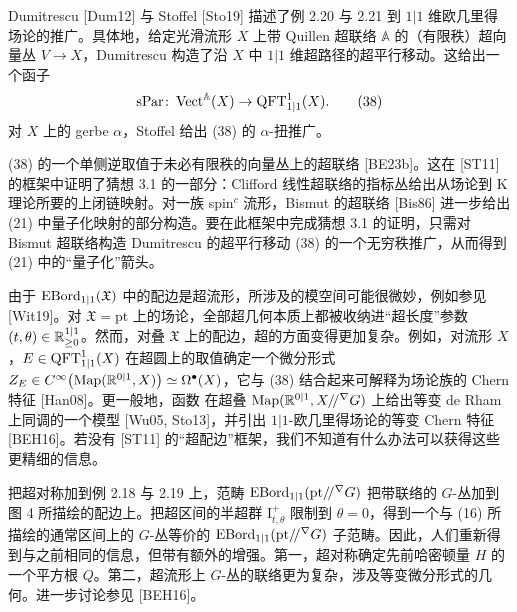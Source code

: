 \begin{example}[3.23（带超联络的超向量丛）]
Dumitrescu [Dum12] 与 Stoffel [Sto19] 描述了例 2.20 与 2.21 到 $1|1$ 维欧几里得场论的推广。具体地，给定光滑流形 $X$ 上带 Quillen 超联络 $\mathbb{A}$ 的（有限秩）超向量丛 $V\to X$，Dumitrescu 构造了沿 $X$ 中 $1|1$ 维超路径的超平行移动。这给出一个函子
\begin{equation}
\mathrm{sPar}\colon\operatorname{Vect}^{\mathbb{A}}(X)\to\operatorname{QFT}^1_{1|1}(X).
\tag{38}
\end{equation}
对 $X$ 上的 gerbe $\alpha$，Stoffel 给出 (38) 的 $\alpha$-扭推广。
\end{example}

\begin{remark}[3.24]
(38) 的一个单侧逆取值于未必有限秩的向量丛上的超联络 [BE23b]。这在 [ST11] 的框架中证明了猜想 3.1 的一部分：Clifford 线性超联络的指标丛给出从场论到 K 理论所要的上闭链映射。对一族 spin$^c$ 流形，Bismut 的超联络 [Bis86] 进一步给出 (21) 中量子化映射的部分构造。要在此框架中完成猜想 3.1 的证明，只需对 Bismut 超联络构造 Dumitrescu 的超平行移动 (38) 的一个无穷秩推广，从而得到 (21) 中的“量子化”箭头。
\end{remark}

\begin{remark}[3.25]
由于 $\operatorname{EBord}_{1|1}(\mathfrak X)$ 中的配边是超流形，所涉及的模空间可能很微妙，例如参见 [Wit19]。对 $\mathfrak X=\mathrm{pt}$ 上的场论，全部超几何本质上都被收纳进“超长度”参数 $(t,\theta)\in\mathbb{R}^{1|1}_{\ge0}$。然而，对叠 $\mathfrak X$ 上的配边，超的方面变得更加复杂。例如，对流形 $X$，$E\in\operatorname{QFT}^1_{1|1}(X)$ 在超圆上的取值确定一个微分形式 $Z_E\in C^\infty\bigl(\mathrm{Map}(\mathbb{R}^{0|1},X)\bigr)\simeq\Omega^\bullet(X)$，它与 (38) 结合起来可解释为场论族的 Chern 特征 [Han08]。更一般地，函数
在超叠 $\mathrm{Map}(\mathbb{R}^{0|1},X/\!/^{\nabla}G)$ 上给出等变 de Rham 上同调的一个模型 [Wu05, Sto13]，并引出 $1|1$-欧几里得场论的等变 Chern 特征 [BEH16]。若没有 [ST11] 的“超配边”框架，我们不知道有什么办法可以获得这些更精细的信息。
\end{remark}

\begin{example}[3.26（射影 $G$-表示）]
把超对称加到例 2.18 与 2.19 上，范畴 $\operatorname{EBord}_{1|1}(\mathrm{pt}/\!/^{\nabla}G)$ 把带联络的 $G$-丛加到图 4 所描绘的配边上。把超区间的半超群 $\mathrm{I}^+_{t,\theta}$ 限制到 $\theta=0$，得到一个与 (16) 所描绘的通常区间上的 $G$-丛等价的 $\operatorname{EBord}_{1|1}(\mathrm{pt}/\!/^{\nabla}G)$ 子范畴。因此，人们重新得到与之前相同的信息，但带有额外的增强。第一，超对称确定先前哈密顿量 $H$ 的一个平方根 $Q$。第二，超流形上 $G$-丛的联络更为复杂，涉及等变微分形式的几何。进一步讨论参见 [BEH16]。
\end{example}
